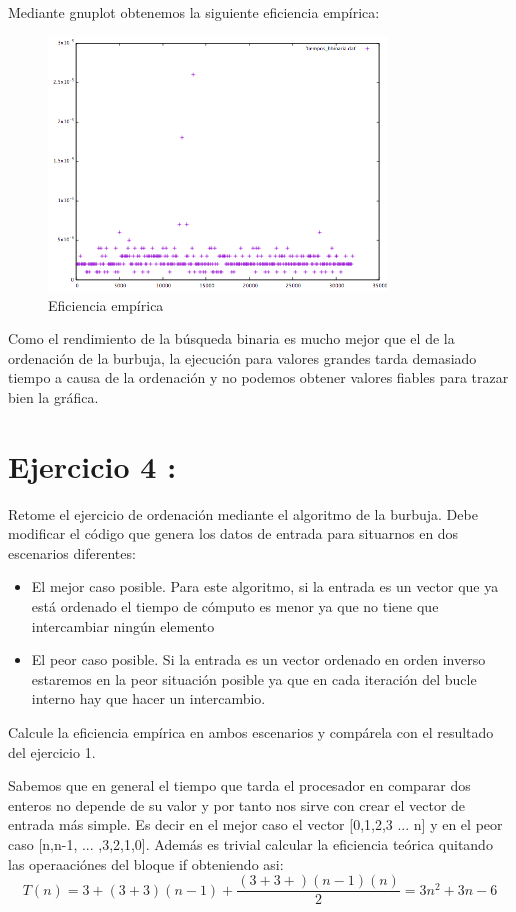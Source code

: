 \documentclass{article}
\begin{document}
	Mediante gnuplot obtenemos la siguiente eficiencia emp\'irica:
	\begin{figure}[H]
  		\caption{Eficiencia emp\'irica}
  		\centering
  		\includegraphics[width=0.8\textwidth]{ejer3/grafica.png}
	\end{figure}
	
	Como el rendimiento de la b\'usqueda binaria es mucho mejor que el de la ordenaci\'on de la burbuja, la ejecuci\'on para valores grandes tarda demasiado tiempo a causa de la ordenaci\'on y no podemos obtener valores fiables para trazar bien la gr\'afica.

\clearpage
\section{Ejercicio 4 :}
Retome el ejercicio de ordenación mediante el algoritmo de la burbuja. Debe modificar el
código que genera los datos de entrada para situarnos en dos escenarios diferentes:
\begin{itemize}
	\item El mejor caso posible. Para este algoritmo, si la entrada es un vector que ya está ordenado el tiempo de cómputo es menor ya que no tiene que intercambiar ningún elemento
	\item El peor caso posible. Si la entrada es un vector ordenado en orden inverso estaremos en la peor situación posible ya que en cada iteración del bucle interno hay que hacer un intercambio.
\end{itemize}
	Calcule la eficiencia empírica en ambos escenarios y compárela con el resultado del ejercicio 1.
\clearpage

Sabemos que en general el tiempo que tarda el procesador en comparar dos enteros no depende de su valor y por tanto nos sirve con crear el vector de entrada m\'as simple. Es decir en el mejor caso el vector [0,1,2,3 ... n] y en el peor caso [n,n-1, ... ,3,2,1,0]. Adem\'as es trivial calcular la eficiencia te\'orica quitando las operaaci\'ones del bloque if obteniendo asi:
	\begin{equation}
			T(n) = 3 + (3+3)(n-1) + \frac{(3+3+)(n-1)(n)}{2} = 3n^2 + 3n -6
	\end{equation}
\end{document}
